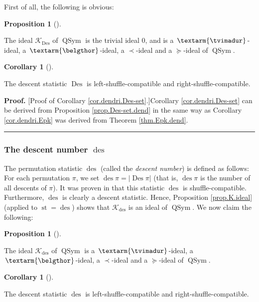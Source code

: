 \documentclass[numbers=enddot,12pt,final,onecolumn,notitlepage]{scrartcl}%
\theoremstyle{definition}
\newtheorem{prop}[theo]{Proposition}
\newenvironment{proposition}[1][]
{\begin{prop}[#1]\begin{leftbar}}
{\end{leftbar}\end{prop}}
\newtheorem{coro}[theo]{Corollary}
\newenvironment{corollary}[1][]
{\begin{coro}[#1]\begin{leftbar}}
{\end{leftbar}\end{coro}}
\newenvironment{proof}[1][Proof]{\noindent\textbf{#1.} }{\ \rule{0.5em}{0.5em}}
\newcommand{\tvi}{\left. \textarm{\tvimadur} \right.}
\newcommand{\bel}{\left. \textarm{\belgthor} \right.}
\begin{document}
First of all, the following is obvious:

\begin{proposition}
\label{prop.Des-set.dend}The ideal $\mathcal{K}_{\operatorname*{Des}}$ of
$\operatorname*{QSym}$ is the trivial ideal $0$, and is a $\tvi$-ideal, a
$\bel$-ideal, a $\left.  \prec\right.  $-ideal and a $\left.  \succeq\right.
$-ideal of $\operatorname*{QSym}$.
\end{proposition}

\begin{corollary}
\label{cor.dendri.Des-set}The descent statistic $\operatorname*{Des}$ is
left-shuffle-compatible and right-shuffle-compatible.
\end{corollary}

\begin{proof}
[Proof of Corollary \ref{cor.dendri.Des-set}.]Corollary
\ref{cor.dendri.Des-set} can be derived from Proposition
\ref{prop.Des-set.dend} in the same way as Corollary \ref{cor.dendri.Epk} was
derived from Theorem \ref{thm.Epk.dend}.
\end{proof}

\subsubsection{The descent number $\operatorname*{des}$}

The permutation statistic $\operatorname*{des}$ (called the \textit{descent
number}) is defined as follows: For each permutation $\pi$, we set
$\operatorname*{des}\pi=\left\vert \operatorname*{Des}\pi\right\vert $ (that
is, $\operatorname*{des}\pi$ is the number of all descents of $\pi$). It was
proven in \cite[Theorem 4.6 \textbf{(a)}]{part1} that this statistic
$\operatorname*{des}$ is shuffle-compatible. Furthermore, $\operatorname*{des}%
$ is clearly a descent statistic. Hence, Proposition \ref{prop.K.ideal}
(applied to $\operatorname*{st}=\operatorname*{des}$) shows that
$\mathcal{K}_{\operatorname*{des}}$ is an ideal of $\operatorname*{QSym}$. We
now claim the following:

\begin{proposition}
\label{prop.des.dend}The ideal $\mathcal{K}_{\operatorname*{des}}$ of
$\operatorname*{QSym}$ is a $\tvi$-ideal, a $\bel$-ideal, a $\left.
\prec\right.  $-ideal and a $\left.  \succeq\right.  $-ideal of
$\operatorname*{QSym}$.
\end{proposition}

\begin{corollary}
\label{cor.dendri.des}The descent statistic $\operatorname*{des}$ is
left-shuffle-compatible and right-shuffle-compatible.
\end{corollary}
\end{document}
